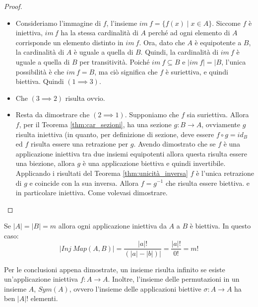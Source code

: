 \begin{proof}
	\begin{itemize}
		\item Consideriamo l'immagine di $f$, l'insieme $im \ f = \{f(x) \; | \; x \in A\}$. Siccome $f$ è iniettiva, $im \ f$ ha la stessa cardinalità di $A$ perché ad ogni elemento di $A$ corrisponde un elemento distinto in $im \ f$. Ora, dato che $A$ è equipotente a $B$, la cardinalità di $A$ è uguale a quella di $B$. Quindi, la cardinalità di $im \ f$ è uguale a quella di $B$ per transitività. Poiché $im \ f \subseteq B$ e $|im \ f| = |B$, l'unica possibilità è che $im \ f = B$, ma ciò significa che $f$ è suriettiva, e quindi biettiva. Quindi $(1 \implies 3)$.
		\item Che $(3 \implies 2)$ risulta ovvio.
		\item Resta da dimostrare che $(2 \implies 1)$. Supponiamo che $f$ sia suriettiva. Allora $f$, per il Teorema \ref{thm:car_sezioni}, ha una sezione $g: B \rightarrow A$, ovviamente $g$ risulta iniettiva (in quanto, per definizione di sezione, deve essere $f \circ g = id_{B}$ ed $f$ risulta essere una retrazione per $g$. Avendo dimostrato che se $f$ è una applicazione iniettiva tra due insiemi equipotenti allora questa risulta essere una biezione, allora $g$ è una applicazione biettiva e quindi invertibile. Applicando i risultati del Teorema \ref{thm:unicità_inversa} $f$ è l'unica retrazione di $g$ e coincide con la sua inversa. Allora $f = g^{-1}$ che risulta essere biettiva. e in particolare iniettiva. Come volevasi dimostrare.
	\end{itemize}
\end{proof}

\begin{corolbox}
	Se $|A| = |B|=m$ allora ogni applicazione iniettiva da $A$ a $B$ è biettiva. In questo caso:
	\begin{displaymath}
		|Inj \ Map(A,B)| = \frac{|a|!}{(|a|-|b|)|}= \frac{|a|!}{0!}=m!
	\end{displaymath}
\end{corolbox}

\begin{osservation}
	Per le conclusioni appena dimostrate, un insieme risulta infinito se esiste un'applicazione iniettiva $f: A \rightarrow A$. Inoltre, l'insieme delle permutazioni in un insieme $A$, $Sym(A)$, ovvero l'insieme delle applicazioni biettive $\sigma: A \longrightarrow A$ ha ben $|A|!$ elementi.
\end{osservation}


